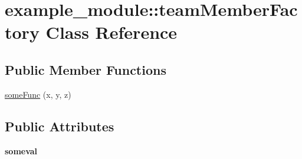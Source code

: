 \hypertarget{classexample__module_1_1teamMemberFactory}{\section{example\-\_\-module\-:\-:team\-Member\-Factory Class Reference}
\label{classexample__module_1_1teamMemberFactory}
}
\subsection*{Public Member Functions}
\begin{DoxyCompactItemize}
\item 
\hyperlink{classexample__module_1_1teamMemberFactory_ae25bbed3260b36508056132a7ac300c1}{some\-Func} (x, y, z)
\end{DoxyCompactItemize}
\subsection*{Public Attributes}
\begin{DoxyCompactItemize}
\item 
\hypertarget{classexample__module_1_1teamMemberFactory_a35e5b1a7fe96690b7ecc44c877095f6e}{{\bfseries someval}}\label{classexample__module_1_1teamMemberFactory_a35e5b1a7fe96690b7ecc44c877095f6e}

\end{DoxyCompactItemize}


